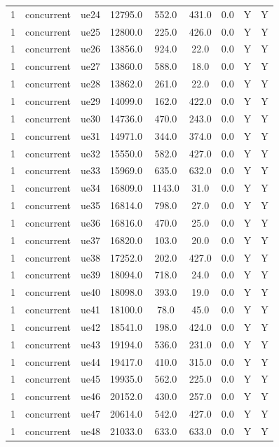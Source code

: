 \begin{table}[ht]
\begin{tabular}{|c|c|c|c|c|c|c|c|c|}
1 & concurrent & ue24 & 12795.0 & 552.0 & 431.0 & 0.0 & Y & Y \\
1 & concurrent & ue25 & 12800.0 & 225.0 & 426.0 & 0.0 & Y & Y \\
1 & concurrent & ue26 & 13856.0 & 924.0 & 22.0 & 0.0 & Y & Y \\
1 & concurrent & ue27 & 13860.0 & 588.0 & 18.0 & 0.0 & Y & Y \\
1 & concurrent & ue28 & 13862.0 & 261.0 & 22.0 & 0.0 & Y & Y \\
1 & concurrent & ue29 & 14099.0 & 162.0 & 422.0 & 0.0 & Y & Y \\
1 & concurrent & ue30 & 14736.0 & 470.0 & 243.0 & 0.0 & Y & Y \\
1 & concurrent & ue31 & 14971.0 & 344.0 & 374.0 & 0.0 & Y & Y \\
1 & concurrent & ue32 & 15550.0 & 582.0 & 427.0 & 0.0 & Y & Y \\
1 & concurrent & ue33 & 15969.0 & 635.0 & 632.0 & 0.0 & Y & Y \\
1 & concurrent & ue34 & 16809.0 & 1143.0 & 31.0 & 0.0 & Y & Y \\
1 & concurrent & ue35 & 16814.0 & 798.0 & 27.0 & 0.0 & Y & Y \\
1 & concurrent & ue36 & 16816.0 & 470.0 & 25.0 & 0.0 & Y & Y \\
1 & concurrent & ue37 & 16820.0 & 103.0 & 20.0 & 0.0 & Y & Y \\
1 & concurrent & ue38 & 17252.0 & 202.0 & 427.0 & 0.0 & Y & Y \\
1 & concurrent & ue39 & 18094.0 & 718.0 & 24.0 & 0.0 & Y & Y \\
1 & concurrent & ue40 & 18098.0 & 393.0 & 19.0 & 0.0 & Y & Y \\
1 & concurrent & ue41 & 18100.0 & 78.0 & 45.0 & 0.0 & Y & Y \\
1 & concurrent & ue42 & 18541.0 & 198.0 & 424.0 & 0.0 & Y & Y \\
1 & concurrent & ue43 & 19194.0 & 536.0 & 231.0 & 0.0 & Y & Y \\
1 & concurrent & ue44 & 19417.0 & 410.0 & 315.0 & 0.0 & Y & Y \\
1 & concurrent & ue45 & 19935.0 & 562.0 & 225.0 & 0.0 & Y & Y \\
1 & concurrent & ue46 & 20152.0 & 430.0 & 257.0 & 0.0 & Y & Y \\
1 & concurrent & ue47 & 20614.0 & 542.0 & 427.0 & 0.0 & Y & Y \\
1 & concurrent & ue48 & 21033.0 & 633.0 & 633.0 & 0.0 & Y & Y \\

\end{tabular}
\end{table}
